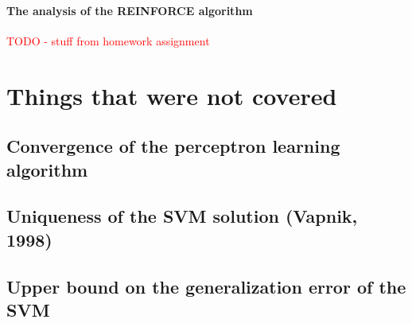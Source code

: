 \documentclass[11pt]{book} %
\begin{document}
\subsubsection{The analysis of the REINFORCE algorithm}
\textcolor{red}{TODO - stuff from homework assignment}

%
%
%
%
%
%
%
%
%
%
%
%
%
%
%
%

\chapter{Things that were not covered}

\section{Convergence of the perceptron learning algorithm}

\section{Uniqueness of the SVM solution (Vapnik, 1998)}

\section{Upper bound on the generalization error of the SVM}

\backmatter
\end{document}
